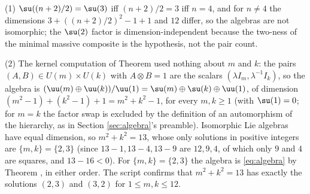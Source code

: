 (1) $\su((n+2)/2) = \su(3)$ iff $(n+2)/2 = 3$ iff $n = 4$, and for $n \neq 4$ the dimensions $3 + ((n+2)/2)^{2} - 1 + 1$ and $12$ differ, so the algebras are not isomorphic; the $\su(2)$ factor is dimension-independent because the two-ness of the minimal massive composite is the hypothesis, not the pair count.

(2) The kernel computation of Theorem  used nothing about $m$ and $k$: the pairs $(A, B) \in U(m) \times U(k)$ with $A \otimes B = 1$ are the scalars $(\lambda I_{m}, \lambda^{-1}I_{k})$, so the algebra is $(\uu(m) \oplus \uu(k))/\uu(1) = \su(m) \oplus \su(k) \oplus \uu(1)$, of dimension $(m^{2} - 1) + (k^{2} - 1) + 1 = m^{2} + k^{2} - 1$, for every $m, k \ge 1$ (with $\su(1) = 0$; for $m = k$ the factor swap is excluded by the definition of an automorphism of the hierarchy, as in Section \ref{sec:algebra}'s preamble). Isomorphic Lie algebras have equal dimension, so $m^{2} + k^{2} = 13$, whose only solutions in positive integers are $\{m, k\} = \{2, 3\}$ (since $13 - 1, 13 - 4, 13 - 9$ are $12, 9, 4$, of which only $9$ and $4$ are squares, and $13 - 16 < 0$). For $\{m, k\} = \{2, 3\}$ the algebra is \eqref{eq:algebra} by Theorem , in either order. The script confirms that $m^{2} + k^{2} = 13$ has exactly the solutions $(2, 3)$ and $(3, 2)$ for $1 \le m, k \le 12$.
